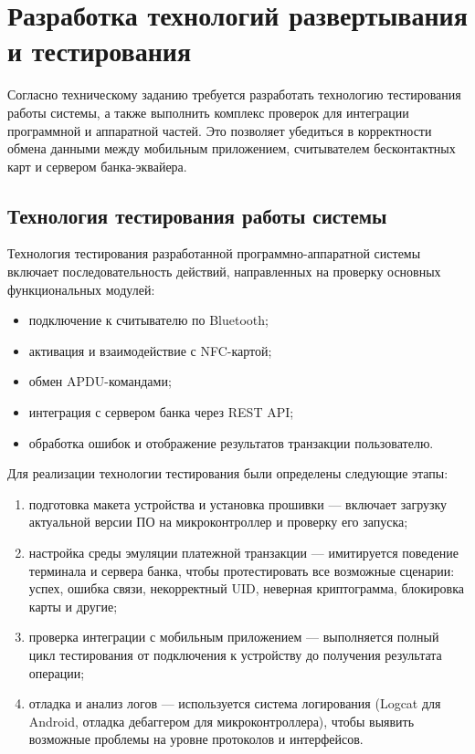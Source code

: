 \newpage

\section{Разработка технологий развертывания и тестирования}

Согласно техническому заданию требуется разработать технологию тестирования работы системы, а также выполнить комплекс проверок для интеграции программной и аппаратной частей.
Это позволяет убедиться в корректности обмена данными между мобильным приложением, считывателем бесконтактных карт и сервером банка-эквайера.

\subsection{Технология тестирования работы системы}
Технология тестирования разработанной программно-аппаратной системы включает последовательность действий, направленных на проверку основных функциональных модулей:

\begin{itemize}
	\item подключение к считывателю по Bluetooth;
	\item активация и взаимодействие с NFC-картой;
	\item обмен APDU-командами;
	\item интеграция с сервером банка через REST API;
	\item обработка ошибок и отображение результатов транзакции пользователю.
\end{itemize}

Для реализации технологии тестирования были определены следующие этапы:

\begin{enumerate}
	\item подготовка макета устройства и установка прошивки — включает загрузку актуальной версии ПО на микроконтроллер и проверку его запуска;
	\item настройка среды эмуляции платежной транзакции — имитируется поведение терминала и сервера банка, чтобы протестировать все возможные сценарии: успех, ошибка связи, некорректный UID, неверная криптограмма, блокировка карты и другие;
	\item проверка интеграции с мобильным приложением — выполняется полный цикл тестирования от подключения к устройству до получения результата операции;
	\item отладка и анализ логов — используется система логирования (Logcat для Android, отладка дебаггером для микроконтроллера), чтобы выявить возможные проблемы на уровне протоколов и интерфейсов.
\end{enumerate}

